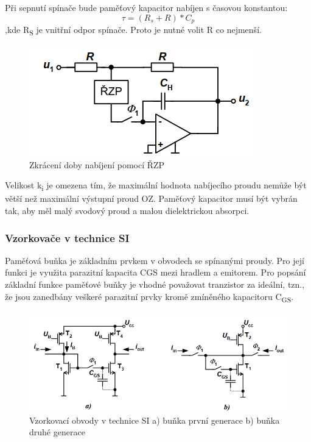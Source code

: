 Při sepnutí spínače bude paměťový kapacitor nabíjen s časovou konstantou:
\begin{equation}
\tau = (R_{s}+R)*C_{p}
\end{equation}
,kde R\textsubscript{S} je vnitřní odpor spínače. Proto je nutné volit R co nejmenší.


\begin{figure}[h]
   \begin{center}
     \includegraphics[scale=0.6]{images/VzorRZP.png}
   \end{center}
   \caption{Zkrácení doby nabíjení pomocí ŘZP}
\end{figure}
Velikost k\textsubscript{i} je omezena tím, že maximální hodnota nabíjecího proudu nemůže být větší než maximální výstupní proud OZ. Paměťový kapacitor musí být vybrán tak, aby měl malý svodový proud a malou dielektrickou absorpci.

\subsubsection{Vzorkovače v technice SI}
Paměťová buňka je základním prvkem v obvodech se spínanými proudy. Pro její funkci je využita parazitní kapacita CGS mezi hradlem a emitorem. Pro popsání základní funkce paměťové buňky je vhodné považovat tranzistor za ideální, tzn., že jsou zanedbány veškeré parazitní prvky kromě zmíněného kapacitoru C\textsubscript{GS}.
\begin{figure}[h]
   \begin{center}
     \includegraphics[scale=0.8]{images/VzorSI.png}
   \end{center}
   \caption{Vzorkovací obvody v technice SI a) buňka první generace b) buňka druhé generace}
\end{figure}










